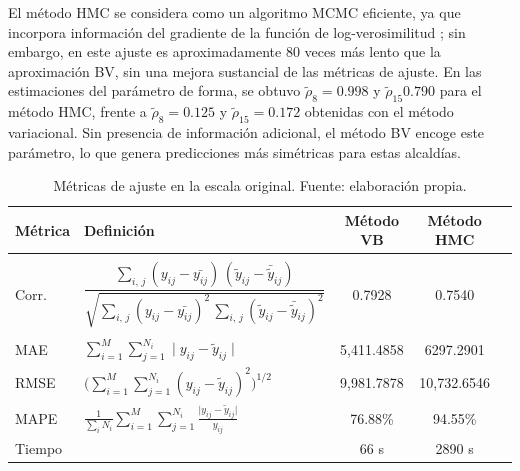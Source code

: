 \documentclass[11pt]{article}
\begin{document}
El método HMC se considera como un algoritmo MCMC eficiente, ya que incorpora información del gradiente de la función de log-verosimilitud \parencite{stan-ref:2025}; sin embargo, en este ajuste es aproximadamente 80 veces más lento que la aproximación BV, sin una mejora sustancial de las métricas de ajuste.
En las estimaciones del parámetro de forma, se obtuvo $\tilde{\rho}_{8}=0.998$ y $\tilde{\rho}_{15}0.790$ para el método HMC, frente a $\tilde{\rho}_{8}=0.125$ y $\tilde{\rho}_{15}=0.172$ obtenidas con el método variacional. Sin presencia de información adicional, el método BV encoge este parámetro, lo que genera predicciones más simétricas para estas alcaldías.

\begin{table}[H]
\centering
\caption[]{Métricas de ajuste en la escala original. Fuente: elaboración propia.}
\label{tab:metricas}
\begin{tabular}{llccc}
\hline
Métrica & Definición & Método VB & Método HMC  \\
\hline \\
Corr. & $\dfrac{\sum_{i,\, j}(y_{ij}-\bar{y_{ij}})\,(\tilde{y}_{ij}-\bar{\tilde{y}}_{ij})}{\sqrt{\sum_{i,\, j}(y_{ij}-\bar{y_{ij}})^{2}\,\sum_{i,\, j}(\tilde{y}_{ij}-\bar{\tilde{y}}_{ij})^{2}}}$ & 0.7928 & 0.7540  \\ \\
MAE & \(\displaystyle\sum_{i=1}^{M}\sum_{j=1}^{N_{i}}\mid{y}_{ij}-\tilde{y}_{ij}\mid \) & 5,411.4858 & 6297.2901 \\ 
RMSE & \(\displaystyle\big(\sum_{i=1}^{M}\sum_{j=1}^{N_{i}}({y}_{ij}-\tilde{y}_{ij})^{2}\big)^{1/2} \) & 9,981.7878 & 10,732.6546 \\
MAPE & \(\displaystyle\frac{1}{\sum_{i} N_{i}}\sum \limits_{i=1}^{M}\sum_{j=1}^{N_{i}}\frac{\vert y_{ij}-\tilde{y}_{ij} \vert}{y_{ij}}\) & 76.88\% & 94.55\% \\
Tiempo & & 66 s & 2890 s\\
\hline
\end{tabular}
\end{table}
\end{document}
